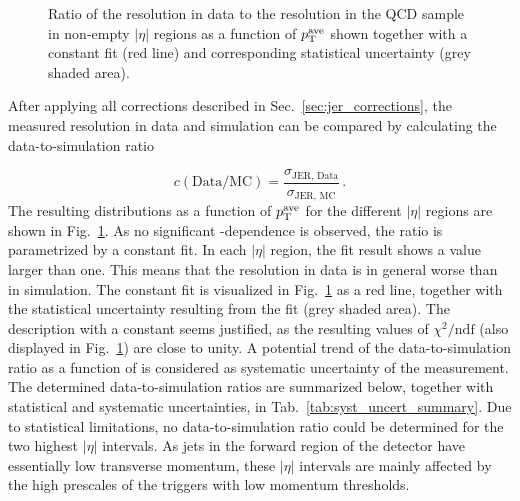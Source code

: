 \begin{figure}[!htp]
\begin{tabular}{cc}
  \end{tabular}
  \caption{Ratio of the resolution in data to the resolution in the \pythia QCD sample in non-empty $|\eta|$ regions as a function of $p_{\text{T}}^\mathrm{ave}$ shown together with a constant fit (red line) and corresponding statistical uncertainty (grey shaded area).}
  \label{fig:ratio}
\end{figure}
After applying all corrections described in Sec.~\ref{sec:jer_corrections}, the measured resolution in data and simulation can be compared by calculating the data-to-simulation ratio

\begin{equation}
  c(\mathrm{Data}/\mathrm{MC}) = \frac{ \sigma_\mathrm{JER,\, Data}}{ \sigma_\mathrm{JER,\, MC}} \, .
 \end{equation}
The resulting distributions as a function of $p_{\text{T}}^\mathrm{ave}$ for the different $|\eta|$ regions are shown in Fig.~\ref{fig:ratio}. As no significant \pt-dependence is observed, the ratio is parametrized by a constant fit. In each $|\eta|$ region, the fit result shows a value larger than one. This means that the resolution in data is in general worse than in simulation. The constant fit is visualized in Fig.~\ref{fig:ratio} as a red line, together with the statistical uncertainty resulting from the fit (grey shaded area). The description with a constant seems justified, as the resulting values of $\chi^2/\mathrm{ndf}$ (also displayed in Fig.~\ref{fig:ratio}) are close to unity. A potential trend of the data-to-simulation ratio as a function of \ptave is considered as systematic uncertainty of the measurement. The determined data-to-simulation ratios are summarized below, together with statistical and systematic uncertainties, in Tab.~\ref{tab:syst_uncert_summary}. Due to statistical limitations, no data-to-simulation ratio could be determined for the two highest $|\eta|$ intervals. As jets in the forward region of the detector have essentially low transverse momentum, these $|\eta|$ intervals are mainly affected by the high prescales of the triggers with low momentum thresholds.   
 
